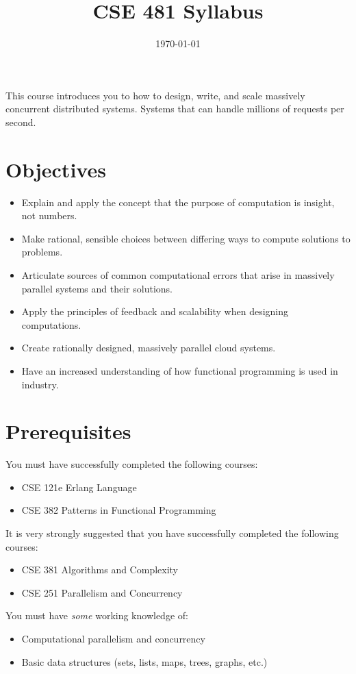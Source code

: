 \documentclass[12pt]{amsart}
\title{CSE 481 Syllabus}
\date{\today}
\begin{document}
\maketitle
This course introduces you to how to design, write, and scale massively concurrent distributed systems. Systems that can handle millions of requests per second.


\section{Objectives}
\begin{itemize}
	\item Explain and apply the concept that the purpose of computation is insight, not numbers.
	\item Make rational, sensible choices between differing ways to compute solutions to problems.
	\item Articulate sources of common computational errors that arise in massively parallel systems and their solutions.
	\item Apply the principles of feedback and scalability when designing computations.
	\item Create rationally designed, massively parallel cloud systems.
	\item Have an increased understanding of how functional programming is used in industry.

\end{itemize}

\section{Prerequisites}

  You must have successfully completed the following courses:
\begin{itemize}
    \item CSE 121e Erlang Language
    \item CSE 382 Patterns in Functional Programming
\end{itemize}
  It is very strongly suggested that you have successfully completed the following courses:
\begin{itemize}
    \item CSE 381 Algorithms and Complexity
    \item CSE 251 Parallelism and Concurrency
\end{itemize}
  You must have \textit{some} working knowledge of:
\begin{itemize}
     \item Computational parallelism and concurrency
     \item Basic data structures (sets, lists, maps, trees, graphs, etc.)
\end{itemize}
\end{document}
